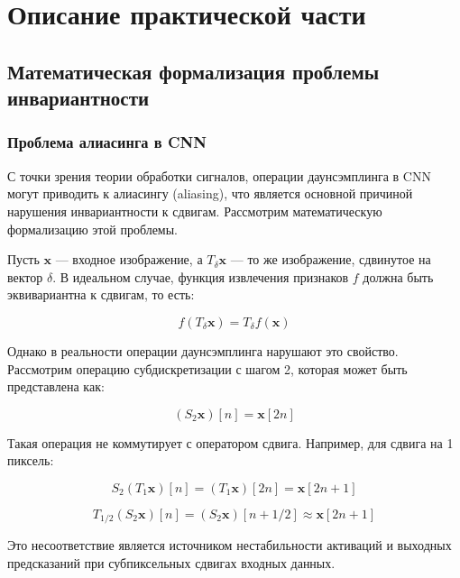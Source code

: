 \section{Описание практической части}
\label{sec:Chapter4} 

\subsection{Математическая формализация проблемы инвариантности}
\label{sec:math}

\subsubsection{Проблема алиасинга в CNN}
\label{sec:math:aliasing}

С точки зрения теории обработки сигналов, операции даунсэмплинга в CNN могут приводить к алиасингу (aliasing), что является основной причиной нарушения инвариантности к сдвигам. Рассмотрим математическую формализацию этой проблемы.

Пусть $\mathbf{x}$ — входное изображение, а $T_{\delta}\mathbf{x}$ — то же изображение, сдвинутое на вектор $\delta$. В идеальном случае, функция извлечения признаков $f$ должна быть эквивариантна к сдвигам, то есть:

\begin{equation}
f(T_{\delta}\mathbf{x}) = T_{\delta}f(\mathbf{x})
\end{equation}

Однако в реальности операции даунсэмплинга нарушают это свойство. Рассмотрим операцию субдискретизации с шагом 2, которая может быть представлена как:

\begin{equation}
(S_2 \mathbf{x})[n] = \mathbf{x}[2n]
\end{equation}

Такая операция не коммутирует с оператором сдвига. Например, для сдвига на 1 пиксель:

\begin{equation}
S_2(T_1 \mathbf{x})[n] = (T_1 \mathbf{x})[2n] = \mathbf{x}[2n+1]
\end{equation}

\begin{equation}
T_{1/2}(S_2 \mathbf{x})[n] = (S_2 \mathbf{x})[n+1/2] \approx \mathbf{x}[2n+1]
\end{equation}

Это несоответствие является источником нестабильности активаций и выходных предсказаний при субпиксельных сдвигах входных данных.

